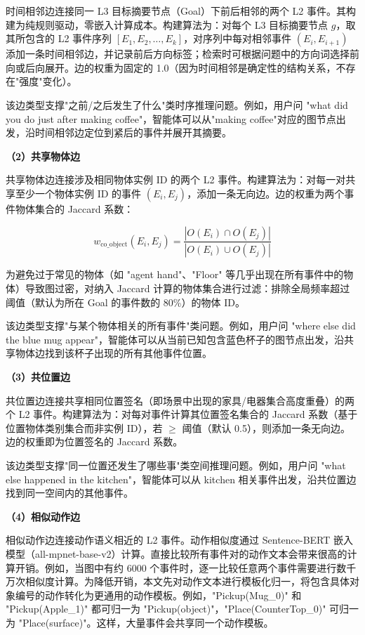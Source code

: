 时间相邻边连接同一 L3 目标摘要节点（Goal）下前后相邻的两个 L2 事件。其构建为纯规则驱动，零嵌入计算成本。构建算法为：对每个 L3 目标摘要节点 $g$，取其所包含的 L2 事件序列 $[E_1, E_2, \ldots, E_k]$，对序列中每对相邻事件 $(E_i, E_{i+1})$ 添加一条时间相邻边，并记录前后方向标签；检索时可根据问题中的方向词选择前向或后向展开。边的权重为固定的 1.0（因为时间相邻是确定性的结构关系，不存在"强度"变化）。

该边类型支撑"之前/之后发生了什么"类时序推理问题。例如，用户问 "what did you do just after making coffee"，智能体可以从"making coffee"对应的图节点出发，沿时间相邻边定位到紧后的事件并展开其摘要。

\textbf{（2）共享物体边}

共享物体边连接涉及相同物体实例 ID 的两个 L2 事件。构建算法为：对每一对共享至少一个物体实例 ID 的事件 $(E_i, E_j)$，添加一条无向边。边的权重为两个事件物体集合的 Jaccard 系数：

\begin{equation}
w_{\mathrm{co\_object}}(E_i, E_j) = \frac{|O(E_i) \cap O(E_j)|}{|O(E_i) \cup O(E_j)|}
\label{eq:3-1}
\end{equation}

为避免过于常见的物体（如 "agent hand"、"Floor" 等几乎出现在所有事件中的物体）导致图过密，对纳入 Jaccard 计算的物体集合进行过滤：排除全局频率超过阈值（默认为所在 Goal 的事件数的 80\%）的物体 ID。

该边类型支撑"与某个物体相关的所有事件"类问题。例如，用户问 "where else did the blue mug appear"，智能体可以从当前已知包含蓝色杯子的图节点出发，沿共享物体边找到该杯子出现的所有其他事件位置。

\textbf{（3）共位置边}

共位置边连接共享相同位置签名（即场景中出现的家具/电器集合高度重叠）的两个 L2 事件。构建算法为：对每对事件计算其位置签名集合的 Jaccard 系数（基于位置物体类别集合而非实例 ID），若 $\ge$ 阈值（默认 0.5），则添加一条无向边。边的权重即为位置签名的 Jaccard 系数。

该边类型支撑"同一位置还发生了哪些事"类空间推理问题。例如，用户问 "what else happened in the kitchen"，智能体可以从 kitchen 相关事件出发，沿共位置边找到同一空间内的其他事件。

\textbf{（4）相似动作边}

相似动作边连接动作语义相近的 L2 事件。动作相似度通过 Sentence-BERT 嵌入模型（all-mpnet-base-v2）计算。直接比较所有事件对的动作文本会带来很高的计算开销。例如，当图中有约 6000 个事件时，逐一比较任意两个事件需要进行数千万次相似度计算。为降低开销，本文先对动作文本进行模板化归一，将包含具体对象编号的动作转化为更通用的动作模板。例如，"Pickup(Mug\_0)" 和 "Pickup(Apple\_1)" 都可归一为 "Pickup(object)"，"Place(CounterTop\_0)" 可归一为 "Place(surface)"。这样，大量事件会共享同一个动作模板。

